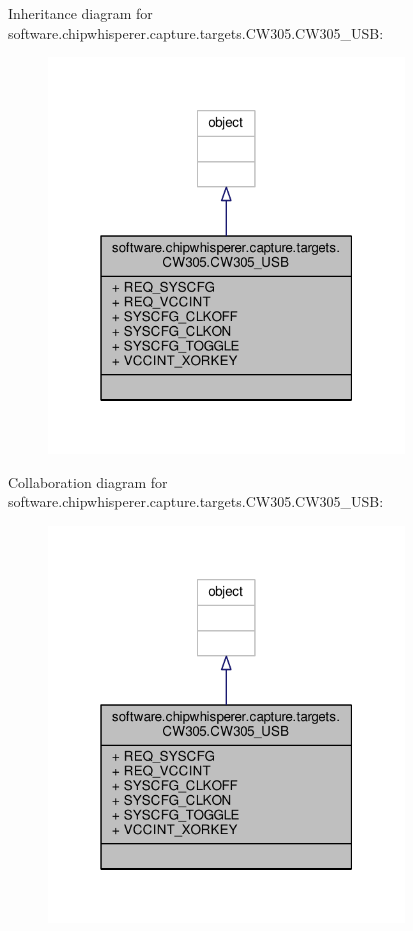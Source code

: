 Inheritance diagram for software.\+chipwhisperer.\+capture.\+targets.\+C\+W305.\+C\+W305\+\_\+\+U\+S\+B\+:\nopagebreak
\begin{figure}[H]
\begin{center}
\leavevmode
\includegraphics[width=268pt]{d7/d0f/classsoftware_1_1chipwhisperer_1_1capture_1_1targets_1_1CW305_1_1CW305__USB__inherit__graph}
\end{center}
\end{figure}


Collaboration diagram for software.\+chipwhisperer.\+capture.\+targets.\+C\+W305.\+C\+W305\+\_\+\+U\+S\+B\+:\nopagebreak
\begin{figure}[H]
\begin{center}
\leavevmode
\includegraphics[width=268pt]{de/d03/classsoftware_1_1chipwhisperer_1_1capture_1_1targets_1_1CW305_1_1CW305__USB__coll__graph}
\end{center}
\end{figure}


